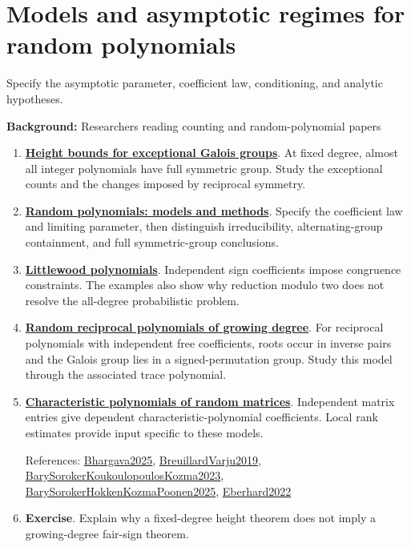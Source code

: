 \documentclass[11pt,a4paper,oneside,openany]{book}
\begin{document}
\section*{Models and asymptotic regimes for random polynomials}
Specify the asymptotic parameter, coefficient law, conditioning, and analytic hypotheses.\par
\textbf{Background:} Researchers reading counting and random-polynomial papers\par
\begin{enumerate}
\item \textbf{\hyperlink{article:height-counting}{Height bounds for exceptional Galois groups}}. At fixed degree, almost all integer polynomials have full symmetric group. Study the exceptional counts and the changes imposed by reciprocal symmetry.\par
\item \textbf{\hyperlink{article:random-models}{Random polynomials: models and methods}}. Specify the coefficient law and limiting parameter, then distinguish irreducibility, alternating-group containment, and full symmetric-group conclusions.\par
\item \textbf{\hyperlink{article:littlewood}{Littlewood polynomials}}. Independent sign coefficients impose congruence constraints. The examples also show why reduction modulo two does not resolve the all-degree probabilistic problem.\par
\item \textbf{\hyperlink{article:random-reciprocal}{Random reciprocal polynomials of growing degree}}. For reciprocal polynomials with independent free coefficients, roots occur in inverse pairs and the Galois group lies in a signed-permutation group. Study this model through the associated trace polynomial.\par
\item \textbf{\hyperlink{article:random-matrices}{Characteristic polynomials of random matrices}}. Independent matrix entries give dependent characteristic-polynomial coefficients. Local rank estimates provide input specific to these models.\par
{\footnotesize References: \hyperlink{ref:Bhargava2025}{Bhargava2025}, \hyperlink{ref:BreuillardVarju2019}{BreuillardVarju2019}, \hyperlink{ref:BarySorokerKoukoulopoulosKozma2023}{BarySorokerKoukoulopoulosKozma2023}, \hyperlink{ref:BarySorokerHokkenKozmaPoonen2025}{BarySorokerHokkenKozmaPoonen2025}, \hyperlink{ref:Eberhard2022}{Eberhard2022}}\par
\item \textbf{Exercise}. Explain why a fixed-degree height theorem does not imply a growing-degree fair-sign theorem.\par
\end{enumerate}
\end{document}
